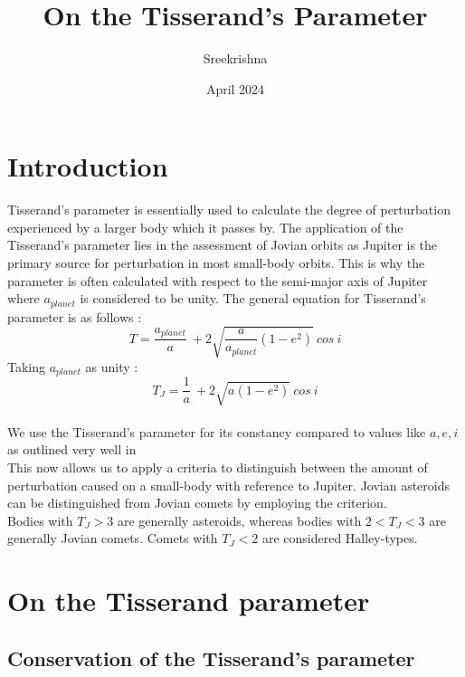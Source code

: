 \documentclass{article}
\title{On the Tisserand's Parameter}
\author{Sreekrishna}
\date{April 2024}
\begin{document}
\maketitle

\section{Introduction}
Tisserand's parameter is essentially used to calculate the degree of perturbation experienced by a larger body which it passes by. The application of the Tisserand's parameter lies in the assessment of Jovian orbits as Jupiter is the primary source for perturbation in most small-body orbits. This is why the parameter is often calculated with respect to the semi-major axis of Jupiter where $a_{planet}$ is considered to be unity. The general equation for Tisserand's parameter is as follows : 
\begin{equation}
    T = \frac{a_{planet}}{a} \ + 2\sqrt{\frac{a}{a_{planet}}(1-e^2)}\ cos\ i
\end{equation}
Taking $a_{planet}$ as unity : 
\begin{equation}
    T_J = \frac{1}{a} \ + 2\sqrt{a(1-e^2)}\ cos\ i
\end{equation}
\\ We use the Tisserand's parameter for its constancy compared to values like $a, e, i$ as outlined very well in \cite{1995EM&P...68...71C} 
\\ This now allows us to apply a criteria to distinguish between the amount of perturbation caused on a small-body with reference to Jupiter. Jovian asteroids can be distinguished from Jovian comets by employing the criterion. \\
Bodies with $T_J >3$ are generally asteroids, whereas bodies with $2<T_J<3 $ are generally Jovian comets. Comets with $T_J <2$ are considered Halley-types.
\section{On the Tisserand parameter}
\subsection{Conservation of the Tisserand's parameter}
\end{document}
